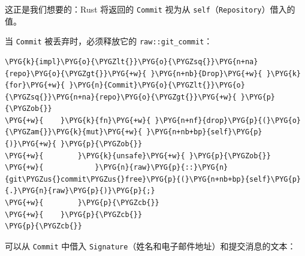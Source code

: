这正是我们想要的：Rust 将返回的 \texttt{Commit} 视为从 \texttt{self}（\texttt{Repository}）借入的值。

当 \texttt{Commit} 被丢弃时，必须释放它的 \texttt{raw::git\_commit}：

\begin{Verbatim}[commandchars=\\\{\},breaklines=true,breakanywhere=true,fontsize=\codefont,xleftmargin=17bp]
\PYG{k}{impl}\PYG{o}{\PYGZlt{}}\PYG{o}{\PYGZsq{}}\PYG{n+na}{repo}\PYG{o}{\PYGZgt{}}\PYG{+w}{ }\PYG{n+nb}{Drop}\PYG{+w}{ }\PYG{k}{for}\PYG{+w}{ }\PYG{n}{Commit}\PYG{o}{\PYGZlt{}}\PYG{o}{\PYGZsq{}}\PYG{n+na}{repo}\PYG{o}{\PYGZgt{}}\PYG{+w}{ }\PYG{p}{\PYGZob{}}
\PYG{+w}{    }\PYG{k}{fn}\PYG{+w}{ }\PYG{n+nf}{drop}\PYG{p}{(}\PYG{o}{\PYGZam{}}\PYG{k}{mut}\PYG{+w}{ }\PYG{n+nb+bp}{self}\PYG{p}{)}\PYG{+w}{ }\PYG{p}{\PYGZob{}}
\PYG{+w}{        }\PYG{k}{unsafe}\PYG{+w}{ }\PYG{p}{\PYGZob{}}
\PYG{+w}{            }\PYG{n}{raw}\PYG{p}{::}\PYG{n}{git\PYGZus{}commit\PYGZus{}free}\PYG{p}{(}\PYG{n+nb+bp}{self}\PYG{p}{.}\PYG{n}{raw}\PYG{p}{)}\PYG{p}{;}
\PYG{+w}{        }\PYG{p}{\PYGZcb{}}
\PYG{+w}{    }\PYG{p}{\PYGZcb{}}
\PYG{p}{\PYGZcb{}}
\end{Verbatim}

可以从 \texttt{Commit} 中借入 \texttt{Signature}（姓名和电子邮件地址）和提交消息的文本：

